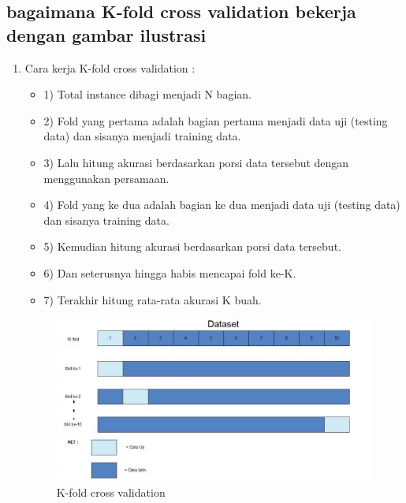 \begin{enumerate}
\begin{enumerate}
\begin{enumerate}
\begin{enumerate}
\begin{enumerate}
\begin{enumerate}
\begin{enumerate}
\begin{enumerate}
\begin{enumerate}
\begin{enumerate}
\subsection{bagaimana K-fold cross validation bekerja dengan gambar ilustrasi}
\begin{enumerate}
\item Cara kerja K-fold cross validation :
\begin{itemize}
\item 1)	Total instance dibagi menjadi N bagian.
\item 2)	Fold yang pertama adalah bagian pertama menjadi data uji (testing data) dan sisanya menjadi training data.
\item 3)	Lalu hitung akurasi berdasarkan porsi data tersebut dengan menggunakan persamaan.
\item 4)	Fold yang ke dua adalah bagian ke dua menjadi data uji (testing data) dan sisanya training data. 
\item 5)	Kemudian hitung akurasi berdasarkan porsi data tersebut.
\item 6)	Dan seterusnya hingga habis mencapai fold ke-K.
\item 7)	Terakhir hitung rata-rata akurasi K buah.
\end{itemize}
\begin{figure}[ht]
\centering
\includegraphics[scale=0.5]{figures/f5.jpg}
\caption{K-fold cross validation }
\label{contoh}
\end{figure}


\end{enumerate}
\end{enumerate}
\end{enumerate}
\end{enumerate}
\end{enumerate}
\end{enumerate}
\end{enumerate}
\end{enumerate}
\end{enumerate}
\end{enumerate}
\end{enumerate}
